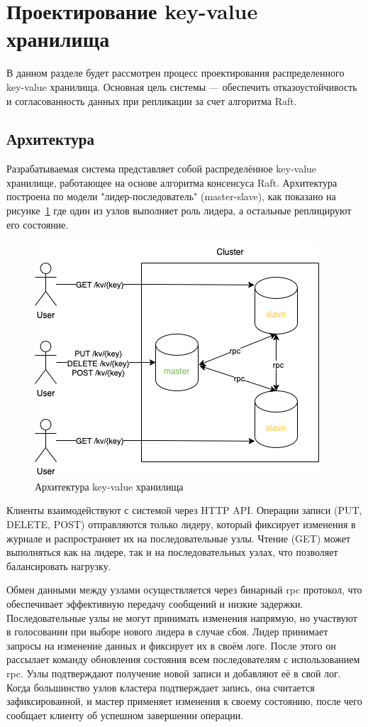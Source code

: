 \section{Проектирование key-value хранилища}

В данном разделе будет рассмотрен процесс проектирования распределенного key-value
хранилища. Основная цель системы — обеспечить отказоустойчивость и согласованность
данных при репликации за счет алгоритма Raft.

\subsection{Архитектура}

Разрабатываемая система представляет собой распределённое key-value хранилище,
работающее на основе алгоритма консенсуса Raft. Архитектура построена по модели
"лидер-последователь" (master-slave), как показано на рисунке~\ref{fig:fig1} где
один из узлов выполняет роль лидера, а остальные реплицируют его состояние.

\begin{figure}
  \centering
  \includegraphics[scale=0.6]{assets/kv_cluster.png}
  \caption{Архитектура key-value хранилища}
  \label{fig:fig1}
\end{figure}

Клиенты взаимодействуют с системой через HTTP API. Операции записи (PUT, DELETE, POST)
отправляются только лидеру, который фиксирует изменения в журнале и распространяет их
на последовательные узлы. Чтение (GET) может выполняться как на лидере, так и на
последовательных узлах, что позволяет балансировать нагрузку.

Обмен данными между узлами осуществляется через бинарный rpc протокол, что обеспечивает
эффективную передачу сообщений и низкие задержки. Последовательные узлы не могут
принимать изменения напрямую, но участвуют в голосовании при выборе нового лидера в
случае сбоя. Лидер принимает запросы на изменение данных и фиксирует их в своём логе.
После этого он рассылает команду обновления состояния всем последователям с
использованием rpc. Узлы подтверждают получение новой записи и добавляют её в свой лог.
Когда большинство узлов кластера подтверждает запись, она считается зафиксированной, и
мастер применяет изменения к своему состоянию, после чего сообщает клиенту об успешном
завершении операции.  

